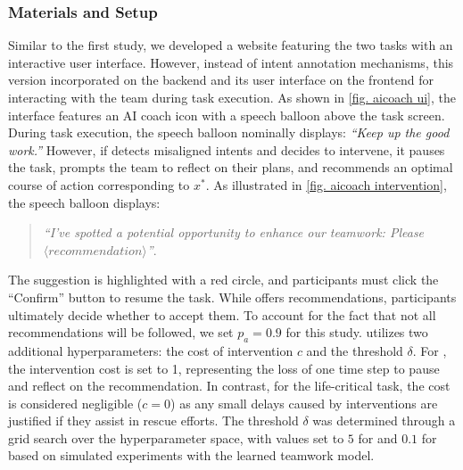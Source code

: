 \subsubsection{Materials and Setup}
Similar to the first study, we developed a website featuring the two tasks with an interactive user interface. However, instead of intent annotation mechanisms, this version incorporated \coach on the backend and its user interface on the frontend for interacting with the team during task execution. As shown in \cref{fig. aicoach ui}, the interface features an AI coach icon with a speech balloon above the task screen.
During task execution, the speech balloon nominally displays: \textit{``Keep up the good work.''}
However, if \coach detects misaligned intents and decides to intervene, it pauses the task, prompts the team to reflect on their plans, and recommends an optimal course of action corresponding to $x^*$. As illustrated in \cref{fig. aicoach intervention}, the speech balloon displays:
\begin{quote}
\centering
\textit{``I've spotted a potential opportunity to enhance our teamwork: Please $\langle recommendation\rangle$''}. 
\end{quote}
The suggestion is highlighted with a red circle, and participants must click the ``Confirm'' button to resume the task.
While \coach offers recommendations, participants ultimately decide whether to accept them.
To account for the fact that not all recommendations will be followed, we set $p_a = 0.9$ for this study. 
\coach utilizes two additional hyperparameters: the cost of intervention $c$ and the threshold $\delta$. For \movers, the intervention cost is set to 1, representing the loss of one time step to pause and reflect on the recommendation. In contrast, for the life-critical \rescue task, the cost is considered negligible ($c = 0$) as any small delays caused by interventions are justified if they assist in rescue efforts. The threshold $\delta$ was determined through a grid search over the hyperparameter space, with values set to $5$ for \movers and $0.1$ for \rescue based on simulated experiments with the learned teamwork model.

